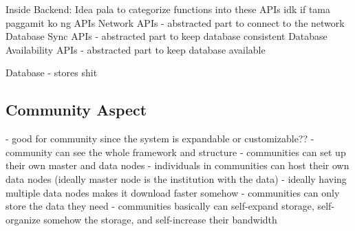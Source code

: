 \documentclass[acmsmall]{acmart}
\begin{document}
Inside Backend: Idea pala to categorize functions into these APIs idk if tama paggamit ko ng APIs
Network APIs - abstracted part to connect to the network
Database Sync APIs - abstracted part to keep database consistent
Database Availability APIs - abstracted part to keep database available


Database - stores shit


\subsection{Community Aspect}
- good for community since the system is expandable or customizable??
- community can see the whole framework and structure
- communities can set up their own master and data nodes
- individuals in communities can host their own data nodes (ideally master node is the institution with the data)
- ideally having multiple data nodes makes it download faster somehow
- communities can only store the data they need
- communities basically can self-expand storage, self-organize somehow the storage, and self-increase their bandwidth 
\end{document}
